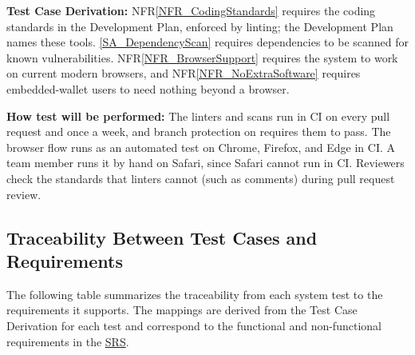 \documentclass[12pt]{article}
\newcommand{\nfrref}[1]{NFR\ref{#1}}
\newcommand{\saref}[1]{\ref{#1}}
\newcommand{\fixture}[1]{\texttt{\seqsplit{#1}}}
\begin{document}
\begin{enumerate}
\textbf{Test Case Derivation:} \nfrref{NFR_CodingStandards} requires the coding standards in the Development
Plan, enforced by linting; the Development Plan names these tools. \saref{SA_DependencyScan}
requires dependencies to be scanned for known vulnerabilities. \nfrref{NFR_BrowserSupport} requires
the system to work on current modern browsers, and \nfrref{NFR_NoExtraSoftware} requires
embedded-wallet users to need nothing beyond a browser.

\textbf{How test will be performed:} The linters and scans run in CI on every pull
request and once a week, and branch protection on \fixture{main} requires them
to pass. The browser flow runs as an automated test on Chrome, Firefox, and
Edge in CI. A team member runs it by hand on Safari, since Safari cannot run
in CI. Reviewers check the standards that linters cannot (such as
\fixture{rustdoc} comments) during pull request review.

\end{enumerate}

\subsection{Traceability Between Test Cases and Requirements}

The following table summarizes the traceability from each system test to the
requirements it supports. The mappings are derived from the Test Case
Derivation for each test and correspond to the functional and non-functional
requirements in the \href{../SRS/SRS.pdf}{SRS}.
\end{document}
